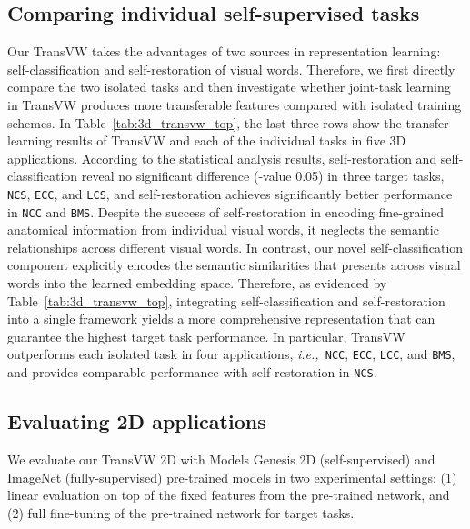 \documentclass[journal,twoside,web]{ieeecolor}
\def\tablename{Table}
\newcommand{\ie}{\mbox{\emph{i.e.,\ }}}
\begin{document}
\subsection{Comparing individual self-supervised tasks}
\label{sec:abl_isolated}
Our TransVW takes the advantages of two sources in representation learning: self-classification and self-restoration of visual words. Therefore,  we first directly compare the two isolated tasks and then investigate  whether joint-task learning in TransVW produces more transferable features compared with isolated training schemes. 
In \tablename~\ref{tab:3d_transvw_top}, the last three rows show the transfer learning results of TransVW and each of the  individual tasks in five 3D applications.  
 According to  the statistical analysis results, self-restoration and self-classification reveal no significant difference (-value  0.05) in three target tasks,  \texttt{NCS}, \texttt{ECC}, and \texttt{LCS}, and self-restoration achieves significantly better performance in \texttt{NCC} and \texttt{BMS}.
Despite the success of self-restoration in encoding fine-grained anatomical information from individual visual words, it neglects the semantic relationships across different visual words. In contrast, our novel self-classification component explicitly encodes the semantic similarities that presents across visual  words into the learned embedding space. Therefore, as evidenced by \tablename~\ref{tab:3d_transvw_top}, integrating self-classification and self-restoration into a single framework yields a more comprehensive representation that can guarantee the highest target task performance. In particular, TransVW outperforms each isolated task in four applications, \ie \texttt{NCC}, \texttt{ECC}, \texttt{LCC}, and \texttt{BMS}, and provides comparable performance with self-restoration in \texttt{NCS}. 



\subsection{Evaluating 2D applications}
\label{sec:ablation_2d}

We evaluate our TransVW 2D with Models Genesis 2D (self-supervised) and ImageNet (fully-supervised) pre-trained models in two experimental settings: (1) linear evaluation on top of the fixed features from the pre-trained network, and (2) full fine-tuning of the pre-trained network for target tasks. 
\end{document}
